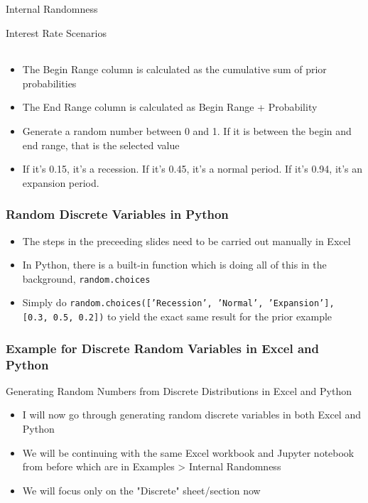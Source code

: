 \documentclass[handout, 11pt]{beamer}
\begin{document}
\begin{section}{Internal Randomness}
\begin{frame}
\begin{block}{Interest Rate Scenarios}
\begin{center}
\begin{tabular}{L{2cm}|cccc}
\end{tabular}
\end{center}
\end{block}
\begin{itemize}
\footnotesize
\item The Begin Range column is calculated as the cumulative sum of prior probabilities
\vfill
\item The End Range column is calculated as Begin Range + Probability
\vfill
\item Generate a random number between 0 and 1. If it is between the begin and end range, that is the selected value
\vfill
\item If it's 0.15, it's a recession. If it's 0.45, it's a normal period. If it's 0.94, it's an expansion period.
\end{itemize}
\end{frame}
\begin{frame}
\frametitle{Random Discrete Variables in Python}
\begin{itemize}
\item The steps in the preceeding slides need to be carried out manually in Excel
\vfill
\item In Python, there is a built-in function which is doing all of this in the background,
\texttt{random.choices}
\vfill
\item Simply do
\texttt{random.choices(['Recession', 'Normal', 'Expansion'], [0.3, 0.5, 0.2])}
to yield the exact same result for the prior example
\end{itemize}
\end{frame}
\begin{frame}
\frametitle{Example for Discrete Random Variables in Excel and Python}
{
\begin{block}{Generating Random Numbers from Discrete Distributions in Excel and Python}
\begin{itemize}
\item I will now go through generating random discrete variables in both Excel and Python
\item We will be continuing with the same Excel workbook and Jupyter notebook from before which are in Examples > Internal Randomness
\item We will focus only on the "Discrete" sheet/section now
\end{itemize}
\end{block}
}
\end{frame}
\begin{frame}

\end{frame}
\end{section}
\end{document}
